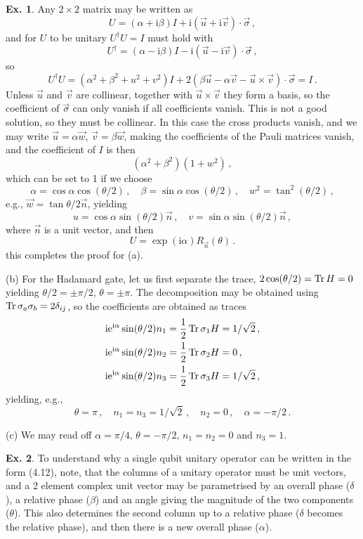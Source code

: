 \documentclass[a4paper,12pt]{article}
\def\e{\mathrm{e}}
\def\imagi{\mathrm{i}}
\def\Tr{\ensuremath{\mathop{\rm Tr}}{}}
\theoremstyle{definition}
\newtheorem{exercise}{Ex.}[section]
\begin{document}
\begin{exercise}
 Any $2\times 2$ matrix may be written as
 \[
  U = (\alpha + \imagi \beta) I + \imagi (\vec{u} + \imagi \vec{v})\cdot \vec{\sigma}\,,
 \]
 and for $U$ to be unitary $U^\dagger U = I$ must hold with
 \[
  U^\dagger = (\alpha - \imagi \beta) I - \imagi (\vec{u} - \imagi \vec{v})\cdot \vec{\sigma}\,,
 \]
 so
 \[
  U^\dagger U = (\alpha^2 + \beta^2 + u^2 + v^2) I + 2(\beta \vec{u} - \alpha \vec{v} - \vec{u}\times \vec{v})\cdot \vec{\sigma} = I\,.
 \]
 Unless $\vec{u}$ and $\vec{v}$ are collinear, together with $\vec{u}\times \vec{v}$ they form a basis, so the coefficient of $\vec{\sigma}$ can only vanish if all coefficients vanish. This is not a good solution, so they must be collinear. In this case the cross products vanish, and we may write $\vec{u} = \alpha \vec{w}$, $\vec{v} = \beta\vec{w}$, making the coefficients of the Pauli matrices vanish, and the coefficient of $I$ is then
 \[
  (\alpha^2 + \beta^2) (1+w^2)\,,
 \]
 which can be set to 1 if we choose
 \[
  \alpha = \cos\alpha \cos(\theta/2)\,,\quad
  \beta = \sin\alpha \cos(\theta/2)\,,\quad
  w^2 = \tan^2(\theta/2)\,,
 \]
 e.g., $\vec{w} = \tan{\theta/2}\vec{n}$, yielding
 \[
  u = \cos\alpha \sin(\theta/2) \vec{n}\,,\quad v=\sin\alpha \sin(\theta/2)\vec{n}\,,
 \]
 where $\vec{n}$ is a unit vector, and then
 \[
  U = \exp(\imagi \alpha) R_{\vec{n}}(\theta)\,.
 \]
 this completes the proof for (a).
 
 (b) For the Hadamard gate, let us first separate the trace, $2\cos(\theta/2) = \Tr H = 0$ yielding $\theta/2 = \pm \pi/2$, $\theta=\pm \pi$. The decomposition may be obtained using $\Tr \sigma_a \sigma_b = 2\delta_{ij}$, so the coefficients are obtained as traces
 \[
  \begin{aligned}
  \imagi \e^{\imagi\alpha}\sin(\theta/2) n_1 &= \frac{1}{2}\Tr \sigma_1 H = 1/\sqrt{2}\,,\\
  \imagi \e^{\imagi\alpha}\sin(\theta/2) n_2 &= \frac{1}{2}\Tr \sigma_2 H = 0\,,\\
  \imagi \e^{\imagi\alpha}\sin(\theta/2) n_3 &= \frac{1}{2}\Tr \sigma_3 H = 1/\sqrt{2}\,,\\
  \end{aligned}
 \]
 yielding, e.g.,
 \[
  \theta = \pi\,,\quad n_1=n_3=1/\sqrt{2}\,,\quad n_2=0\,,\quad \alpha=-\pi/2\,.
 \]

 (c) We may read off $\alpha=\pi/4$, $\theta=-\pi/2$, $n_1=n_2=0$ and $n_3=1$.
\end{exercise}

\begin{exercise}
 To understand why a single qubit unitary operator can be written in the form (4.12), note, that the columns of a unitary operator must be unit vectors, and a 2 element complex unit vector may be parametrised by an overall phase ($\delta$), a relative phase ($\beta$) and an angle giving the magnitude of the two components ($\theta$). This also determines the second column up to a relative phase ($\delta$ becomes the relative phase), and then there is a new overall phase ($\alpha$).
\end{exercise}
\end{document}

